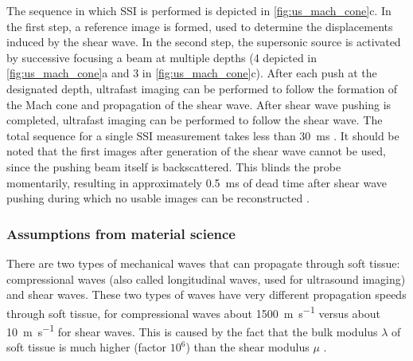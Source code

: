 The sequence in which SSI is performed is depicted in \autoref{fig:us_mach_cone}c. In the first step, a reference image is formed, used to determine the displacements induced by the shear wave. In the second step, the supersonic source is activated by successive focusing a beam at multiple depths (4 depicted in \autoref{fig:us_mach_cone}a and 3 in \autoref{fig:us_mach_cone}c). After each push at the designated depth, ultrafast imaging can be performed to follow the formation of the Mach cone and propagation of the shear wave. After shear wave pushing is completed, ultrafast imaging can be performed to follow the shear wave. The total sequence for a single SSI measurement takes less than \SI{30}{\milli\second} \cite{bercoff_supersonic_2004}. It should be noted that the first images after generation of the shear wave cannot be used, since the pushing beam itself is backscattered. This blinds the probe momentarily, resulting in approximately   \SI{0.5}{\milli\second} of dead time after shear wave pushing during which no usable images can be reconstructed \cite{deffieux_shear_2009}.


\subsubsection{Assumptions from material science}
There are two types of mechanical waves that can propagate through soft tissue: compressional waves (also called longitudinal waves, used for ultrasound imaging) and shear waves. These two types of waves have very different propagation speeds through soft tissue, for compressional waves about \SI{1500}{\meter\per\second} versus about \SI{10}{\meter\per\second} for shear waves. This is caused by the fact that the bulk modulus $\lambda$ of soft tissue is much higher (factor $10^6$) than the shear modulus $\mu$ \cite{minin_ultrafast_2011}. 

